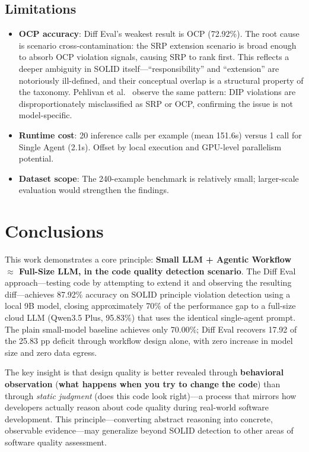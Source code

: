 \documentclass[12pt,a4paper,oneside]{report}
\begin{document}
\section{Limitations}

\begin{itemize}
  \item \textbf{OCP accuracy}: Diff Eval's weakest result is OCP (72.92\%). The root cause is scenario cross-contamination: the SRP extension scenario is broad enough to absorb OCP violation signals, causing SRP to rank first. This reflects a deeper ambiguity in SOLID itself---``responsibility'' and ``extension'' are notoriously ill-defined, and their conceptual overlap is a structural property of the taxonomy. Pehlivan et al.~\cite{Pehlivan2025} observe the same pattern: DIP violations are disproportionately misclassified as SRP or OCP, confirming the issue is not model-specific.
  \item \textbf{Runtime cost}: 20 inference calls per example (mean 151.6s) versus 1 call for Single Agent (2.1s). Offset by local execution and GPU-level parallelism potential.
  \item \textbf{Dataset scope}: The 240-example benchmark is relatively small; larger-scale evaluation would strengthen the findings.
\end{itemize}

\chapter{Conclusions}
\label{ch:conclusions}

This work demonstrates a core principle: \textbf{Small LLM + Agentic Workflow $\approx$ Full-Size LLM, in the code quality detection scenario}. The Diff Eval approach---testing code by attempting to extend it and observing the resulting diff---achieves 87.92\% accuracy on SOLID principle violation detection using a local 9B model, closing approximately 70\% of the performance gap to a full-size cloud LLM (Qwen3.5 Plus, 95.83\%) that uses the identical single-agent prompt. The plain small-model baseline achieves only 70.00\%; Diff Eval recovers 17.92 of the 25.83 pp deficit through workflow design alone, with zero increase in model size and zero data egress.

The key insight is that design quality is better revealed through \textbf{behavioral observation} (\textbf{what happens when you try to change the code}) than through \emph{static judgment} (does this code look right)---a process that mirrors how developers actually reason about code quality during real-world software development. This principle---converting abstract reasoning into concrete, observable evidence---may generalize beyond SOLID detection to other areas of software quality assessment.
\end{document}
